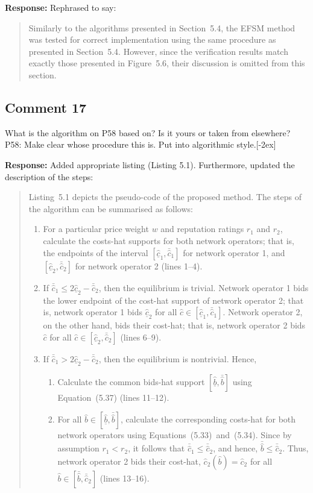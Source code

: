 \documentclass[10pt,a4paper,notitlepage]{article}
\numberwithin{equation}{section}
\begin{document}
\textbf{Response:}
Rephrased to say:
\begin{quote}
Similarly to the algorithms presented in Section~5.4, the EFSM method was tested for correct implementation using the same procedure as presented in Section~5.4. However, since the verification results match exactly those presented in Figure~5.6, their discussion is omitted from this section.
\end{quote}

\subsection{Comment 17}
What is the algorithm on P58 based on? Is it yours or taken from elsewhere? P58: Make clear whose procedure this is. Put into algorithmic style.[-2ex]

\textbf{Response:}
Added appropriate listing (Listing 5.1). Furthermore, updated the description of the steps:
\begin{quote}
Listing~5.1 depicts the pseudo-code of the proposed method. The steps of the algorithm can be summarised as follows:
\begin{enumerate}
\item For a particular price weight $w$ and reputation ratings $r_1$ and $r_2$, calculate the costs-hat supports for both network operators; that is, the endpoints of the interval $[\underline{\hat{c}}_1, \bar{\hat{c}}_1]$ for network operator 1, and $[\underline{\hat{c}}_2, \bar{\hat{c}}_2]$ for network operator 2 (lines 1--4).
\item If $\bar{\hat{c}}_1 \le 2\underline{\hat{c}}_2 - \bar{\hat{c}}_2$, then the equilibrium is trivial. Network operator 1 bids the lower endpoint of the cost-hat support of network operator 2; that is, network operator 1 bids $\underline{\hat{c}}_2$ for all $\hat{c}\in [\underline{\hat{c}}_1, \bar{\hat{c}}_1]$. Network operator 2, on the other hand, bids their cost-hat; that is, network operator 2 bids $\hat{c}$ for all $\hat{c}\in [\underline{\hat{c}}_2, \bar{\hat{c}}_2]$ (lines 6--9).
\item If $\bar{\hat{c}}_1 > 2\underline{\hat{c}}_2 - \bar{\hat{c}}_2$, then the equilibrium is nontrivial. Hence,
\begin{enumerate}
\item Calculate the common bids-hat support $[\underline{\hat{b}}, \bar{\hat{b}}]$ using Equation~(5.37) (lines 11--12).
\item For all $\hat{b}\in [\underline{\hat{b}}, \bar{\hat{b}}]$, calculate the corresponding costs-hat for both network operators using Equations~(5.33)~and~(5.34). Since by assumption $r_1 < r_2$, it follows that $\bar{\hat{c}}_1 \le \bar{\hat{c}}_2$, and hence, $\bar{\hat{b}}\le \bar{\hat{c}}_2$. Thus, network operator 2 bids their cost-hat, $\hat{c}_2(\hat{b}) = \hat{c}_2$ for all $\hat{b}\in [\bar{\hat{b}}, \bar{\hat{c}}_2]$ (lines 13--16).
\end{enumerate}
\end{enumerate}
\end{quote}
\end{document}
